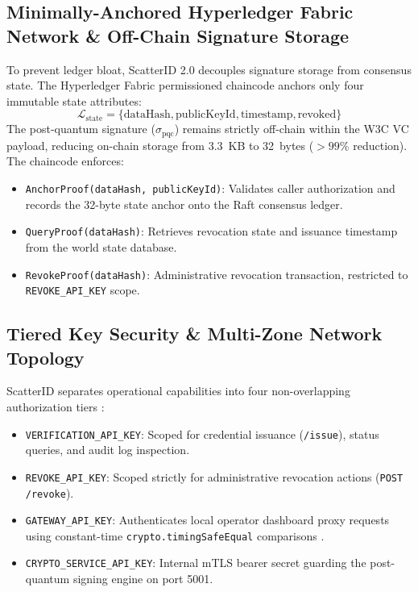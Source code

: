 \documentclass[5p,times,authoryear]{elsarticle}
\begin{document}
\subsection{Minimally-Anchored Hyperledger Fabric Network \& Off-Chain Signature Storage}
To prevent ledger bloat, ScatterID 2.0 decouples signature storage from consensus state. The Hyperledger Fabric permissioned chaincode anchors only four immutable state attributes:
\begin{equation}
\mathcal{L}_{\text{state}} = \{\text{dataHash}, \text{publicKeyId}, \text{timestamp}, \text{revoked}\}
\end{equation}
The post-quantum signature ($\sigma_{\text{pqc}}$) remains strictly off-chain within the W3C VC payload, reducing on-chain storage from 3.3~KB to 32~bytes ($>99\%$ reduction). The chaincode enforces:
\begin{itemize}[leftmargin=*]
\item \texttt{AnchorProof(dataHash, publicKeyId)}: Validates caller authorization and records the 32-byte state anchor onto the Raft consensus ledger.
\item \texttt{QueryProof(dataHash)}: Retrieves revocation state and issuance timestamp from the world state database.
\item \texttt{RevokeProof(dataHash)}: Administrative revocation transaction, restricted to \texttt{REVOKE\_API\_KEY} scope.
\end{itemize}

\subsection{Tiered Key Security \& Multi-Zone Network Topology}
ScatterID separates operational capabilities into four non-overlapping authorization tiers \cite{shams2026security}:
\begin{itemize}[leftmargin=*]
\item \texttt{VERIFICATION\_API\_KEY}: Scoped for credential issuance (\texttt{/issue}), status queries, and audit log inspection.
\item \texttt{REVOKE\_API\_KEY}: Scoped strictly for administrative revocation actions (\texttt{POST /revoke}).
\item \texttt{GATEWAY\_API\_KEY}: Authenticates local operator dashboard proxy requests using constant-time \texttt{crypto.timingSafeEqual} comparisons \cite{nodejs_timingsafe, kocher1996timing}.
\item \texttt{CRYPTO\_SERVICE\_API\_KEY}: Internal mTLS bearer secret guarding the post-quantum signing engine on port 5001.
\end{itemize}
\end{document}

